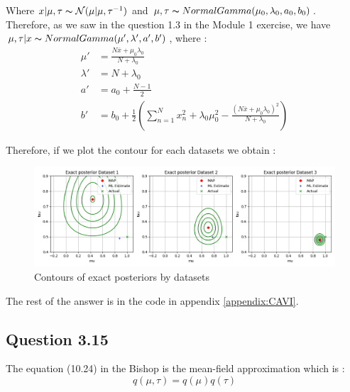 \documentclass{article}
\begin{document}
Where $x|\mu, \tau \thicksim \mathcal{N}(\mu|\mu, \tau^{-1})$ and $\mu, \tau \thicksim NormalGamma(\mu_0, \lambda_0, a_0, b_0)$.
Therefore, as we saw in the question 1.3 in the Module 1 exercise, we have $\mu, \tau|x \thicksim NormalGamma(\mu', \lambda', a', b')$, where :
\begin{equation}
    \begin{split}
        \mu'     & = \frac{N\overline{x} + \mu_0\lambda_0}{N + \lambda_0}                                                                                       \\
        \lambda' & = N + \lambda_0                                                                                                                              \\
        a'       & = a_0 + \frac{N-1}{2}                                                                                                                        \\
        b'       & = b_0 + \frac{1}{2}\left(\sum_{n=1}^{N}x_n^2 + \lambda_0\mu_0^2 - \frac{\left(N\overline{x} + \mu_0\lambda_0\right)^2}{N + \lambda_0}\right)
    \end{split}
\end{equation}

Therefore, if we plot the contour for each datasets we obtain :
\begin{figure}[H]
    \centering
    \includegraphics[scale=0.5]{images/14_contours.png}
    \caption{Contours of exact posteriors by datasets}
    \label{fig:3.14}
\end{figure}

The rest of the answer is in the code in appendix \ref{appendix:CAVI}.

\subsection{Question 3.15}

The equation (10.24) in the Bishop is the mean-field approximation which is :
\begin{equation}
    q(\mu, \tau) = q(\mu)q(\tau)
\end{equation}
\end{document}
